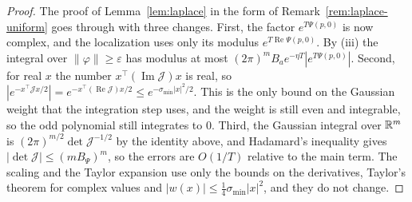 \begin{proof}
The proof of Lemma~\ref{lem:laplace} in the form of Remark~\ref{rem:laplace-uniform} goes through
with three changes. First, the factor $e^{T\Psi(p,0)}$ is now complex, and the localization uses
only its modulus $e^{T\operatorname{Re}\Psi(p,0)}$. By (iii) the integral over
$\lVert\varphi\rVert\ge\varepsilon$ has modulus at most
$(2\pi)^mB_ae^{-\eta T}|e^{T\Psi(p,0)}|$. Second, for real $x$ the number $x^\top(\operatorname{Im}\mathcal J)x$
is real, so $|e^{-x^\top\mathcal Jx/2}|=e^{-x^\top(\operatorname{Re}\mathcal J)x/2}\le e^{-\sigma_{\min}|x|^2/2}$.
This is the only bound on the Gaussian weight that the integration step uses, and the weight is
still even and integrable, so the odd polynomial still integrates to $0$. Third, the Gaussian
integral over $\mathbb{R}^m$ is $(2\pi)^{m/2}\det\mathcal J^{-1/2}$ by the identity above, and Hadamard's
inequality gives $|\det\mathcal J|\le(mB_\Psi)^m$, so the errors are $O(1/T)$ relative to the main
term. The scaling and the Taylor expansion use only the bounds on the derivatives, Taylor's
theorem for complex values and $|w(x)|\le\frac14\sigma_{\min}|x|^2$, and they do not change.
\end{proof}
